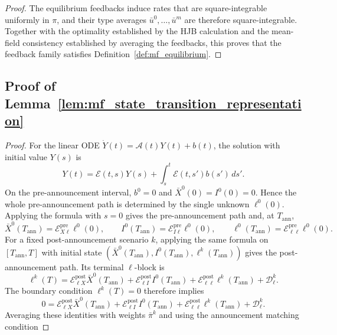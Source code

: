 \documentclass[12pt]{article}
\numberwithin{equation}{section}
\theoremstyle{definition}
\begin{document}
\begin{proof}
The equilibrium feedbacks induce rates that are square-integrable uniformly
in \(\pi\), and their type averages \(\bar u^0,\ldots,\bar u^m\) are therefore
square-integrable. Together with the optimality established by the HJB
calculation and the mean-field consistency established by averaging the
feedbacks, this proves that the feedback family satisfies
Definition~\ref{def:mf_equilibrium}.
\end{proof}

\subsection{Proof of Lemma~\ref{lem:mf_state_transition_representation}}
\label{subsec:proof_mf_state_transition_representation}

\begin{proof}
For the linear ODE \(\dot Y(t)=\mathcal A(t)Y(t)+b(t)\), the solution with
initial value \(Y(s)\) is
\begin{equation}\label{eq:mf_linear_solution_formula}
Y(t)
=
\mathcal E(t,s)Y(s)
+
\int_s^t\mathcal E(t,s')b(s')\,ds'.
\end{equation}
On the pre-announcement interval, \(b^0=0\) and
\(\bar X^0(0)=I^0(0)=0\). Hence the whole pre-announcement path is determined by
the single unknown \(\ell^0(0)\). Applying the formula with \(s=0\)
gives the
pre-announcement path and, at \(T_{\mathrm{ann}}\),
\[
\bar X^0(T_{\mathrm{ann}})
=
\mathcal E^{\mathrm{pre}}_{X\ell}\ell^0(0),
\qquad
I^0(T_{\mathrm{ann}})
=
\mathcal E^{\mathrm{pre}}_{I\ell}\ell^0(0),
\qquad
\ell^0(T_{\mathrm{ann}})
=
\mathcal E^{\mathrm{pre}}_{\ell\ell}\ell^0(0).
\]
For a fixed post-announcement scenario \(k\), applying the same formula on
\([T_{\mathrm{ann}},T]\) with initial state \((\bar X^0(T_{\mathrm{ann}}),I^0(T_{\mathrm{ann}}),\ell^k(T_{\mathrm{ann}}))\) gives the
post-announcement path. Its terminal \(\ell\)-block is
\[
\ell^k(T)
=
\mathcal E^{\mathrm{post}}_{\ell X}\bar X^0(T_{\mathrm{ann}})+
\mathcal E^{\mathrm{post}}_{\ell I}I^0(T_{\mathrm{ann}})+
\mathcal E^{\mathrm{post}}_{\ell\ell}\ell^k(T_{\mathrm{ann}})+
\mathcal D_\ell^k.
\]
The boundary condition \(\ell^k(T)=0\) therefore implies
\begin{equation}\label{eq:simplification_proof_zero_cond}
0
=
\mathcal E^{\mathrm{post}}_{\ell X}\bar X^0(T_{\mathrm{ann}})
+\mathcal E^{\mathrm{post}}_{\ell I}I^0(T_{\mathrm{ann}})
+\mathcal E^{\mathrm{post}}_{\ell\ell}\ell^k(T_{\mathrm{ann}})
+\mathcal D_\ell^k.
\end{equation}
Averaging these identities with weights \(\bar\pi^k\) and using the announcement matching condition

\end{proof}
\end{document}
